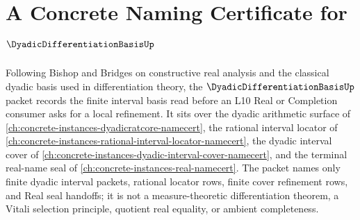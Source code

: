 \chapter{A Concrete Naming Certificate for $\DyadicDifferentiationBasisUp$}
\label{ch:concrete-instances-dyadic-differentiation-basis-namecert}

Following Bishop and Bridges on constructive real analysis and the classical dyadic basis used in differentiation theory, the $\DyadicDifferentiationBasisUp$ packet records the finite interval basis read before an L10 Real or Completion consumer asks for a local refinement. It sits over the dyadic arithmetic surface of \autoref{ch:concrete-instances-dyadicratcore-namecert}, the rational interval locator of \autoref{ch:concrete-instances-rational-interval-locator-namecert}, the dyadic interval cover of \autoref{ch:concrete-instances-dyadic-interval-cover-namecert}, and the terminal real-name seal of \autoref{ch:concrete-instances-real-namecert}. The packet names only finite dyadic interval packets, rational locator rows, finite cover refinement rows, and Real seal handoffs; it is not a measure-theoretic differentiation theorem, a Vitali selection principle, quotient real equality, or ambient completeness.

